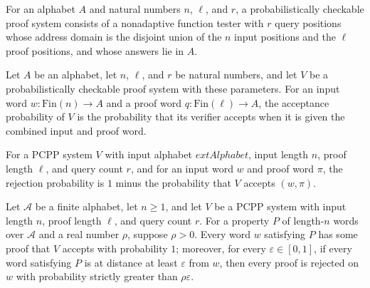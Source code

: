 \begin{definition}
\label{FABL.PCPPSystem}
\leanok
{}
For an alphabet $A$ and natural numbers $n$, $\ell$, and $r$, a probabilistically
checkable proof system consists of a nonadaptive function tester with $r$ query
positions whose address domain is the disjoint union of the $n$ input positions and the
$\ell$ proof positions, and whose answers lie in $A$.
\end{definition}

\begin{definition}
\label{FABL.PCPPSystem.acceptanceProbability}
\leanok
{}
Let $A$ be an alphabet, let $n$, $\ell$, and $r$ be natural numbers, and let $V$ be a
probabilistically checkable proof system with these parameters. For an input word
$w\colon\mathrm{Fin}(n)\to A$ and a proof word $q\colon\mathrm{Fin}(\ell)\to A$, the
acceptance probability of $V$ is the probability that its verifier accepts when it is
given the combined input and proof word.
\end{definition}

\begin{definition}
\label{FABL.PCPPSystem.rejectionProbability}
\leanok
{}
For a PCPP system $V$ with input alphabet $	ext{Alphabet}$, input length $n$, proof
length $\ell$, and query count $r$, and for an input word $w$ and proof word $\pi$, the
rejection probability is $1$ minus the probability that $V$ accepts $(w,\pi)$.
\end{definition}

\begin{definition}
\label{FABL.IsPCPP}
\leanok
{}
Let $\mathcal A$ be a finite alphabet, let $n\ge 1$, and let $V$ be a PCPP system with
input length $n$, proof length $\ell$, and query count $r$. For a property $P$ of
length-$n$ words over $\mathcal A$ and a real number $\rho$, suppose $\rho>0$. Every
word $w$ satisfying $P$ has some proof that $V$ accepts with probability $1$; moreover,
for every $\varepsilon\in[0,1]$, if every word satisfying $P$ is at distance at least
$\varepsilon$ from $w$, then every proof is rejected on $w$ with probability strictly
greater than $\rho\varepsilon$.
\end{definition}

